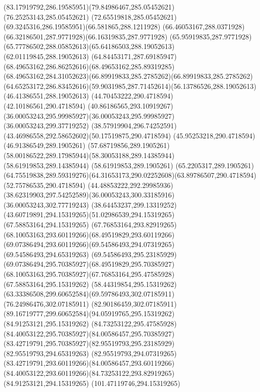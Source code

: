 {{		\curveto(83.17919792,286.19585951)(79.84986467,285.05452621)(76.25253143,285.05452621)
		\curveto(72.65519818,285.05452621)(69.3245316,286.19585951)(66.581865,288.1211928)
		\curveto(66.46053167,288.0371928)(66.32186501,287.9771928)(66.16319835,287.9771928)
		\curveto(65.95919835,287.9771928)(65.77786502,288.05852613)(65.64186503,288.19052613)
		\lineto(62.01119845,288.19052613)
		\curveto(64.84453171,287.69185947)(68.49653162,286.86252616)(68.49653162,285.89319285)
		\curveto(68.49653162,284.31052623)(66.89919833,285.2785262)(66.89919833,285.2785262)
		\curveto(64.65253172,286.83452616)(59.9031985,287.71452614)(56.13786526,288.19052613)
		\lineto(46.41386551,288.19052613)
		\lineto(44.70453222,290.4718594)
		\lineto(42.10186561,290.4718594)
		\curveto(40.86186565,293.10919267)(36.00053243,295.99985927)(36.00053243,295.99985927)
		\lineto(36.00053243,299.37719252)
		\curveto(38.57919904,296.74252591)(43.46986558,292.58652602)(50.17519875,290.4718594)
		\lineto(45.95253218,290.4718594)
		\lineto(46.91386549,289.1905261)
		\lineto(57.68719856,289.1905261)
		\curveto(58.00186522,289.17985944)(58.30053188,289.14385944)(58.61919853,289.14385944)
		\lineto(58.61919853,289.1905261)
		\lineto(65.2205317,289.1905261)
		\curveto(64.75519838,289.59319276)(64.31653173,290.02252608)(63.89786507,290.4718594)
		\lineto(52.75786535,290.4718594)
		\curveto(44.48853222,292.29985936)(38.62319903,297.54252589)(36.00053243,300.33185916)
		\lineto(36.00053243,302.77719243)
		\curveto(38.64453237,299.13319252)(43.60719891,294.15319265)(51.02986539,294.15319265)
		\lineto(67.58853164,294.15319265)
		\curveto(67.76853164,293.82919265)(68.10053163,293.60119266)(68.49519829,293.60119266)
		\curveto(69.07386494,293.60119266)(69.54586493,294.07319265)(69.54586493,294.65319263)
		\curveto(69.54586493,295.23185929)(69.07386494,295.70385927)(68.49519829,295.70385927)
		\curveto(68.10053163,295.70385927)(67.76853164,295.47585928)(67.58853164,295.15319262)
		\lineto(58.44319854,295.15319262)
		\curveto(63.33386508,299.60652584)(69.59786493,302.07185911)(76.24986476,302.07185911)
		\curveto(82.90186459,302.07185911)(89.16719777,299.60652584)(94.05919765,295.15319262)
		\lineto(84.91253121,295.15319262)
		\curveto(84.73253122,295.47585928)(84.40053122,295.70385927)(84.00586457,295.70385927)
		\curveto(83.42719791,295.70385927)(82.95519793,295.23185929)(82.95519793,294.65319263)
		\curveto(82.95519793,294.07319265)(83.42719791,293.60119266)(84.00586457,293.60119266)
		\curveto(84.40053122,293.60119266)(84.73253122,293.82919265)(84.91253121,294.15319265)
		\lineto(101.47119746,294.15319265)
}}
